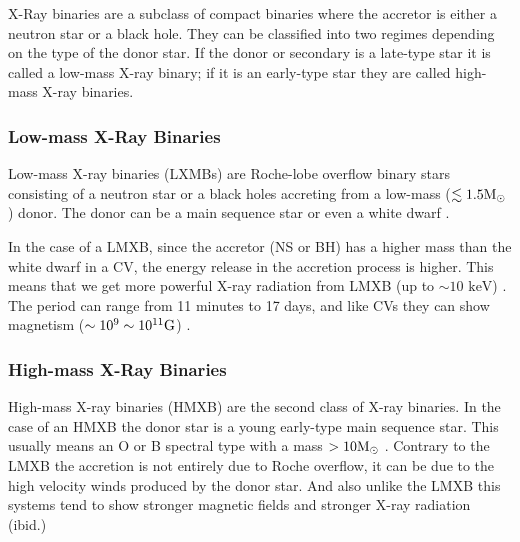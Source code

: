X-Ray binaries are a subclass of compact binaries where the accretor is either a neutron star or a black hole. They can be classified into two regimes depending on the type of the donor star. If the donor or secondary is a late-type star it is called a low-mass X-ray binary; if it is an early-type star they are called high-mass X-ray binaries.

\subsubsection{Low-mass X-Ray Binaries}

Low-mass X-ray binaries (LXMBs) are Roche-lobe overflow binary stars consisting of a neutron star or a black holes accreting from a low-mass ($\lesssim 1.5 \text M_\odot$) donor. The donor can be a main sequence star or even a white dwarf \citep{tauris_formation_2006}.

In the case of a LMXB, since the accretor (NS or BH) has a higher mass than the white dwarf in a CV, the energy release in the accretion process is higher. This means that we get more powerful X-ray radiation from LMXB (up to $\sim 10 \text{ keV}$) \citep{tauris_formation_2006}. The period can range from 11 minutes to 17 days, and like CVs they can show magnetism ($\sim 10^9 \sim 10^{11} \text G$) \citep{tauris_formation_2006}. 


\subsubsection{High-mass X-Ray Binaries}

High-mass X-ray binaries (HMXB) are the second class of X-ray binaries. In the case of an HMXB the donor star is a young early-type main sequence star. This usually means an O or B spectral type with a mass $> 10 \text M _\odot$ \citep[e.g.][]{tauris_formation_2006}. Contrary to the LMXB the accretion is not entirely due to Roche overflow, it can be due to the high velocity winds produced by the donor star. And also unlike the LMXB this systems tend to show stronger magnetic fields and stronger X-ray radiation (ibid.)

